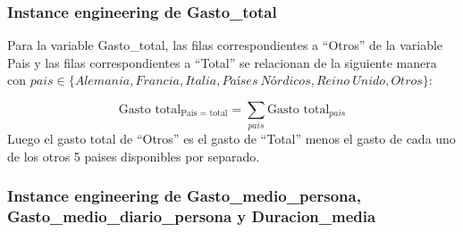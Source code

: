\documentclass[data,article,submit,moreauthors,pdftex]{Definitions/mdpi}
\newenvironment{Shaded}{\begin{snugshade}}{\end{snugshade}}
\newcommand{\ControlFlowTok}[1]{\textcolor[rgb]{0.13,0.29,0.53}{\textbf{#1}}}
\newcommand{\DecValTok}[1]{\textcolor[rgb]{0.00,0.00,0.81}{#1}}
\newcommand{\FunctionTok}[1]{\textcolor[rgb]{0.13,0.29,0.53}{\textbf{#1}}}
\newcommand{\NormalTok}[1]{#1}
\newcommand{\OtherTok}[1]{\textcolor[rgb]{0.56,0.35,0.01}{#1}}
\newcommand{\SpecialCharTok}[1]{\textcolor[rgb]{0.81,0.36,0.00}{\textbf{#1}}}
\newcommand{\StringTok}[1]{\textcolor[rgb]{0.31,0.60,0.02}{#1}}
\begin{document}
\subsubsection{Instance engineering de
Gasto\_total}\label{instance-engineering-de-gasto_total}

Para la variable Gasto\_total, las filas correspondientes a ``Otros'' de
la variable Pais y las filas correspondientes a ``Total'' se relacionan
de la siguiente manera con
\(pais\in\{Alemania, Francia,Italia, Países\ Nórdicos, Reino\ Unido, Otros\}\):

\[ \text{Gasto total}_{\text{Pais = total}} = \sum_{pais}{\text{Gasto total}_{pais}}\]
Luego el gasto total de ``Otros'' es el gasto de ``Total'' menos el
gasto de cada uno de los otros 5 paises disponibles por separado.

\begin{Shaded}
\end{Shaded}

\subsubsection{Instance engineering de Gasto\_medio\_persona,
Gasto\_medio\_diario\_persona y
Duracion\_media}\label{instance-engineering-de-gasto_medio_persona-gasto_medio_diario_persona-y-duracion_media}
\end{document}
